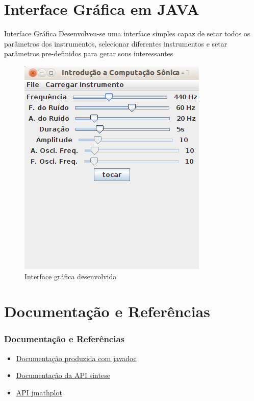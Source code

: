 \documentclass{beamer}
\begin{document}
\section{Interface Gráfica em JAVA}

\begin{frame}
	\begin{block}{Interface Gráfica}
	Desenvolveu-se uma interface simples capaz de setar todos
	os parâmetros dos instrumentos, selecionar diferentes instrumentos e
	setar parâmetros pre-definidos para gerar sons interessantes	
	\end{block}
 \begin{figure}
  \includegraphics[scale=0.4]{./images/interface.png}
  \caption{Interface gráfica desenvolvida}
 \end{figure} 
	
 
\end{frame}


\section{Documentação e Referências}
\begin{frame}
  \frametitle{Documentação e Referências}
  \begin{itemize}
  \item \href{../doc/index.html}{Documentação produzida com javadoc}
  \item \href{http://www.cic.unb.br/docentes/lcmm/sintese/javadoc/}{Documentação da API sintese}
  \item \href{https://code.google.com/p/jmathplot/}{API jmathplot}
  \end{itemize}
\end{frame}
\end{document}
